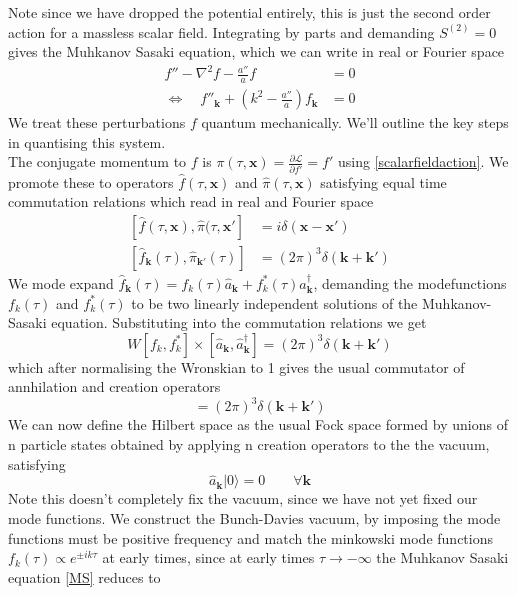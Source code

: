 \documentclass[a4paper,10pt]{article}
\renewcommand{\v}[1]{\mathbf{#1}}
\newcommand{\ann}[1]{\hat{a}_{\v{#1}}}
\newcommand{\cre}[1]{\hat{a}^\dagger_{\v{#1}}}
\newcommand{\vac}{|0 \rangle}
\begin{document}
Note since we have dropped the potential entirely, this is just the second order action for a massless scalar field. Integrating by parts and demanding $S^{(2)}=0$ gives the Muhkanov Sasaki equation, which we can write in real or Fourier space
\begin{equation}\begin{split}
f''-\nabla^2f-\frac{a''}{a}f &= 0 \\
\Leftrightarrow \quad f''_{\v{k}} + (k^2-\frac{a''}{a})f_{\v{k}} &= 0
\label{MS}
\end{split}\end{equation}
We treat these perturbations $f$ quantum mechanically. We'll outline the key steps in quantising this system.\\

The conjugate momentum to $f$ is $\pi(\tau, \v{x}) =  \frac{\partial \mathcal{L}}{\partial f'} = f'$ using \ref{scalarfieldaction}. We promote these to operators $\hat{f}(\tau, \v{x})$ and $\hat{\pi}(\tau, \v{x})$ satisfying equal time commutation relations which read in real and Fourier space
\begin{equation}\begin{split}
[\hat{f}(\tau, \v{x}), \hat{\pi}(\tau, \v{x'}] &= i\delta(\v{x}-\v{x'}) \\
[\hat{f}_{\v{k}}(\tau), \hat{\pi}_{\v{k'}}(\tau)] &= (2\pi)^3\delta(\v{k}+\v{k'})
\end{split}\end{equation}
We mode expand $\hat{f}_{\v{k}}(\tau) = f_k(\tau)\ann{k}+f_k^*(\tau)\cre{k}$, demanding the modefunctions $f_k(\tau)$ and $f_k^*(\tau)$ to be two linearly independent solutions of the Muhkanov-Sasaki equation. Substituting into the commutation relations we get 
\begin{equation}
W[f_k,f_k^*]\times[\ann{k}, \cre{k}] = (2\pi)^3\delta(\v{k}+\v{k'})
\end{equation}
which after normalising the Wronskian to 1 gives the usual commutator of annhilation and creation operators
\begin{equation}
[\ann{k}, \cre{k}] = (2\pi)^3\delta(\v{k}+\v{k'})
\end{equation}
We can now define the Hilbert space as the usual Fock space formed by unions of n particle states obtained by applying n creation operators to the the vacuum, satisfying 
\begin{equation}
\ann{k}\vac =0 \qquad \forall \v{k}
\end{equation}
Note this doesn't completely fix the vacuum, since we have not yet fixed our mode functions. We construct the Bunch-Davies vacuum, by imposing the mode functions must be positive frequency and match the minkowski mode functions $f_k(\tau) \propto e^{\pm ik\tau}$ at early times, since at early times $\tau \rightarrow -\infty$ the Muhkanov Sasaki equation \ref{MS} reduces to 
\end{document}
